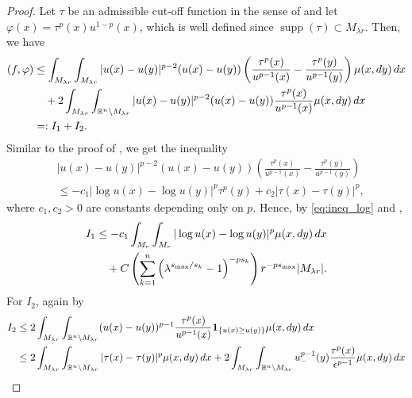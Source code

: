\documentclass[11pt]{amsart}
\theoremstyle{plain}
\theoremstyle{definition}
\numberwithin{equation}{section}
\renewcommand{\d}{\textnormal{d}}
\DeclareMathOperator{\supp}{supp}
\begin{document}
\begin{proof}
Let $\tau$ be an admissible cut-off function in the sense of  and let $\varphi(x) = \tau^p(x)u^{1-p}(x)$, which is well defined since $\supp(\tau) \subset M_{\lambda r}$. Then, we have
\begin{equation} \label{eq:log_I12}
\begin{split}
(f,\varphi)
&\leq \int_{M_{\lambda r}} \int_{M_{\lambda r}} |u(x)-u(y)|^{p-2}(u(x) - u(y)) \left( \frac{\tau^p(x)}{u^{p-1}(x)} - \frac{\tau^p(y)}{u^{p-1}(y)} \right) \mu(x,\d y) \,\d x \\
&\quad + 2\int_{M_{\lambda r}} \int_{\mathbb{R}^n \setminus M_{\lambda r}} |u(x)-u(y)|^{p-2}(u(x) - u(y)) \frac{\tau^p(x)}{u^{p-1}(x)} \mu(x,\d y) \,\d x \\
&=: I_1 + I_2.
\end{split}
\end{equation}
Similar to the proof of \cite[Lemma 1.3]{DCKP16}, we get the inequality
\begin{equation} \label{eq:ineq_log}
\begin{split}
&|u(x)-u(y)|^{p-2} (u(x)-u(y)) \left( \frac{\tau^p(x)}{u^{p-1}(x)} - \frac{\tau^p(y)}{u^{p-1}(y)} \right) \\
&\leq - c_1 |\log u(x) - \log u(y)|^p \tau^p(y) + c_2 |\tau(x)-\tau(y)|^p,
\end{split}
\end{equation}
where $c_1, c_2 >0$ are constants depending only on $p$. Hence, by \eqref{eq:ineq_log} and ,
\begin{equation} \label{eq:log_I1}
\begin{split}
I_1
&\leq -c_1 \int_{M_r} \int_{M_r} |\log u(x) - \log u(y)|^p \mu(x,\d y) \,\d x \\
&\quad + C \left( \sum_{k=1}^n \left( \lambda^{s_{\max}/s_k}-1 \right)^{-ps_k} \right)r^{-ps_{\max}} |M_{\lambda r}|.
\end{split}
\end{equation}
For $I_2$, again by 
\begin{equation} \label{eq:log_I2}
\begin{split}
I_2
&\leq 2\int_{M_{\lambda r}} \int_{\mathbb{R}^n \setminus M_{\lambda r}} (u(x)-u(y))^{p-1} \frac{\tau^p(x)}{u^{p-1}(x)} {\bf 1}_{\lbrace u(x) \geq u(y) \rbrace} \mu(x,\d y) \,\d x \\
&\leq 2\int_{M_{\lambda r}} \int_{\mathbb{R}^n \setminus M_{\lambda r}} |\tau(x) - \tau(y)|^p \mu(x,\d y) \,\d x + 2\int_{M_{\lambda r}} \int_{\mathbb{R}^n \setminus M_{\lambda r}} u_-^{p-1}(y) \frac{\tau^p(x)}{\epsilon^{p-1}} \mu(x,\d y) \,\d x \\

\end{split}
\end{equation}
\end{proof}
\end{document}
